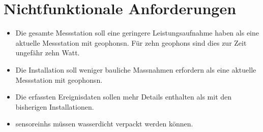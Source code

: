 %
%

\thispagestyle{empty}
\chapter{Nichtfunktionale Anforderungen}\label{chap.nichtfunktionale}

\begin{itemize}
\item Die gesamte Messstation soll eine geringere Leistungsaufnahme haben als eine aktuelle Messstation mit \glspl{geophon}n. Für zehn \glspl{geophon} sind dies zur Zeit ungefähr zehn Watt.

\item Die Installation soll weniger bauliche Massnahmen erfordern als eine aktuelle Messstation mit \glspl{geophon}n.

\item Die erfassten Ereignisdaten sollen mehr Details enthalten als mit den bisherigen Installationen.

\item \glspl{sensoreinh} müssen wasserdicht verpackt werden können.
\
\end{itemize}